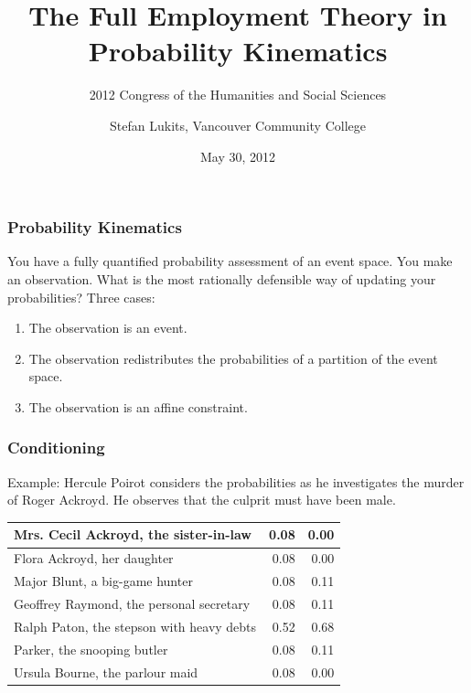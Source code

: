 \documentclass[xcolor=dvipsnames]{beamer}
\title{The Full Employment Theory \linebreak in Probability Kinematics}
\subtitle{2012 Congress of the Humanities and Social Sciences}
\author{Stefan Lukits, Vancouver Community College}
\date{May 30, 2012}
\begin{document}
\begin{frame}
  \titlepage
\end{frame}

\begin{frame}
  \frametitle{Probability Kinematics}
  You have a fully quantified probability assessment of an event
  space. You make an observation. What is the most rationally
  defensible way of updating your probabilities? Three cases:
  \begin{enumerate}
  \item The observation is an event.
  \item The observation redistributes the probabilities of a
    partition of the event space.
  \item The observation is an affine constraint.
  \end{enumerate}
\end{frame}

\begin{frame}
  \frametitle{Conditioning}
  Example: Hercule Poirot considers the probabilities as he
  investigates the murder of Roger Ackroyd. He observes that the
  culprit must have been male.

\mbox{}

\mbox{}

  \begin{tabular}{|l|r|r|} \hline
    Mrs. Cecil Ackroyd, the sister-in-law & 0.08 & 0.00 \\ \hline
    Flora Ackroyd, her daughter & 0.08 & 0.00 \\ \hline
    Major Blunt, a big-game hunter & 0.08 & 0.11 \\ \hline
    Geoffrey Raymond, the personal secretary & 0.08 & 0.11 \\ \hline
    Ralph Paton, the stepson with heavy debts & 0.52 & 0.68 \\ \hline
    Parker, the snooping butler & 0.08 & 0.11 \\ \hline
    Ursula Bourne, the parlour maid & 0.08 & 0.00 \\ \hline
  \end{tabular}
\end{frame}
\end{document}

